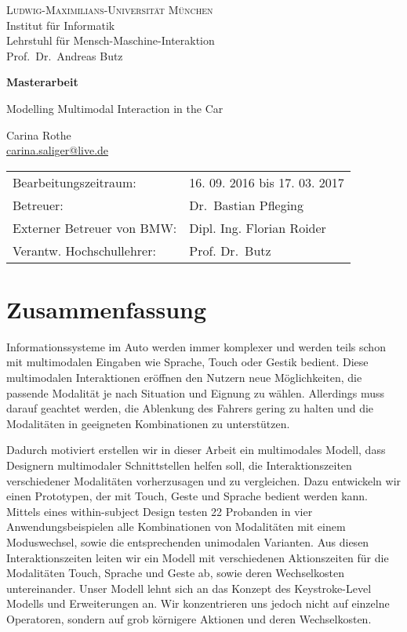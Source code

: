 \documentclass[11pt,a4paper,twoside]{book}
\begin{document}
\pagestyle{empty} %

\begin{center}
\textsc{Ludwig-Maximilians-Universität München}\\
Institut für Informatik\\
Lehrstuhl für Mensch-Maschine-Interaktion\\
Prof.\ Dr.\ Andreas Butz

\vspace{5cm}
{\large\textbf{Masterarbeit}}\vspace{.5cm}

{\LARGE Modelling Multimodal Interaction in the Car}\vspace{1cm}

{\large Carina Rothe}\\\href{carina.saliger@live.de}{carina.saliger@live.de}

\end{center}
\vfill

\begin{tabular}{ll}
Bearbeitungszeitraum: & 16. 09. 2016 bis 17. 03. 2017\\
Betreuer: & Dr.\ Bastian Pfleging \\
Externer Betreuer von BMW: & Dipl. Ing. Florian Roider\\
Verantw. Hochschullehrer: & Prof. Dr.\ Butz 
\end{tabular}
\cleardoublepage
\chapter*{Zusammenfassung}
Informationssysteme im Auto werden immer komplexer und werden teils schon mit multimodalen Eingaben wie Sprache, Touch oder Gestik bedient.
Diese multimodalen Interaktionen eröffnen den Nutzern neue Möglichkeiten, die passende Modalität je nach Situation und Eignung zu wählen.
Allerdings muss darauf geachtet werden, die Ablenkung des Fahrers gering zu halten und die Modalitäten in geeigneten Kombinationen zu unterstützen.

Dadurch motiviert erstellen wir in dieser Arbeit ein multimodales Modell, dass Designern multimodaler Schnittstellen helfen soll, die Interaktionszeiten verschiedener Modalitäten vorherzusagen und zu vergleichen.
Dazu entwickeln wir einen Prototypen, der mit Touch, Geste und Sprache bedient werden kann.
Mittels eines within-subject Design testen 22 Probanden in vier Anwendungsbeispielen alle Kombinationen von Modalitäten mit einem Moduswechsel, sowie die entsprechenden unimodalen Varianten.
Aus diesen Interaktionszeiten leiten wir ein Modell mit verschiedenen Aktionszeiten für die Modalitäten Touch, Sprache und Geste ab, sowie deren Wechselkosten untereinander.
Unser Modell lehnt sich an das Konzept des Keystroke-Level Modells und Erweiterungen an.
Wir konzentrieren uns jedoch nicht auf einzelne Operatoren, sondern auf grob körnigere Aktionen und deren Wechselkosten.
\end{document}
